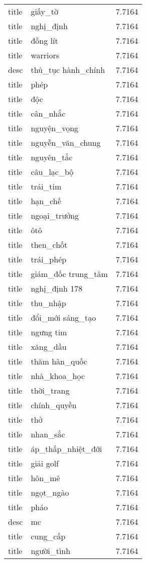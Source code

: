 \documentclass{article}
\begin{document}
\begin{tabular}{lll}
title & giấy\_tờ & 7.7164\\
title & nghị\_định & 7.7164\\
title & đồng lít & 7.7164\\
title & warriors & 7.7164\\
desc & thủ\_tục hành\_chính & 7.7164\\
title & phép & 7.7164\\
title & độc & 7.7164\\
title & cân\_nhắc & 7.7164\\
title & nguyện\_vọng & 7.7164\\
title & nguyễn\_văn\_chung & 7.7164\\
title & nguyên\_tắc & 7.7164\\
title & câu\_lạc\_bộ & 7.7164\\
title & trái\_tim & 7.7164\\
title & hạn\_chế & 7.7164\\
title & ngoại\_trưởng & 7.7164\\
title & ôtô & 7.7164\\
title & then\_chốt & 7.7164\\
title & trái\_phép & 7.7164\\
title & giám\_đốc trung\_tâm & 7.7164\\
title & nghị\_định 178 & 7.7164\\
title & thu\_nhập & 7.7164\\
title & đổi\_mới sáng\_tạo & 7.7164\\
title & ngưng tim & 7.7164\\
title & xăng\_dầu & 7.7164\\
title & thăm hàn\_quốc & 7.7164\\
title & nhà\_khoa\_học & 7.7164\\
title & thời\_trang & 7.7164\\
title & chính\_quyền & 7.7164\\
title & thở & 7.7164\\
title & nhan\_sắc & 7.7164\\
title & áp\_thấp\_nhiệt\_đới & 7.7164\\
title & giải golf & 7.7164\\
title & hôn\_mê & 7.7164\\
title & ngọt\_ngào & 7.7164\\
title & pháo & 7.7164\\
desc & mc & 7.7164\\
title & cung\_cấp & 7.7164\\
title & người\_tình & 7.7164\\

\end{tabular}
\end{document}
